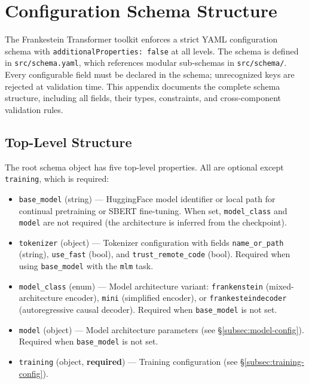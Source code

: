 \section{Configuration Schema Structure}
\label{sec:annex-schema}

The Frankestein Transformer toolkit enforces a strict YAML configuration schema with \texttt{additionalProperties: false} at all levels. The schema is defined in \texttt{src/schema.yaml}, which references modular sub-schemas in \texttt{src/schema/}. Every configurable field must be declared in the schema; unrecognized keys are rejected at validation time. This appendix documents the complete schema structure, including all fields, their types, constraints, and cross-component validation rules.

\subsection{Top-Level Structure}

The root schema object has five top-level properties. All are optional except \texttt{training}, which is required:

\begin{itemize}[nosep]
    \item \texttt{base\_model} (string) --- HuggingFace model identifier or local path for continual pretraining or SBERT fine-tuning. When set, \texttt{model\_class} and \texttt{model} are not required (the architecture is inferred from the checkpoint).
    \item \texttt{tokenizer} (object) --- Tokenizer configuration with fields \texttt{name\_or\_path} (string), \texttt{use\_fast} (bool), and \texttt{trust\_remote\_code} (bool). Required when using \texttt{base\_model} with the \texttt{mlm} task.
    \item \texttt{model\_class} (enum) --- Model architecture variant: \texttt{frankenstein} (mixed-architecture encoder), \texttt{mini} (simplified encoder), or \texttt{frankesteindecoder} (autoregressive causal decoder). Required when \texttt{base\_model} is not set.
    \item \texttt{model} (object) --- Model architecture parameters (see \S\ref{subsec:model-config}). Required when \texttt{base\_model} is not set.
    \item \texttt{training} (object, \textbf{required}) --- Training configuration (see \S\ref{subsec:training-config}).
\end{itemize}


